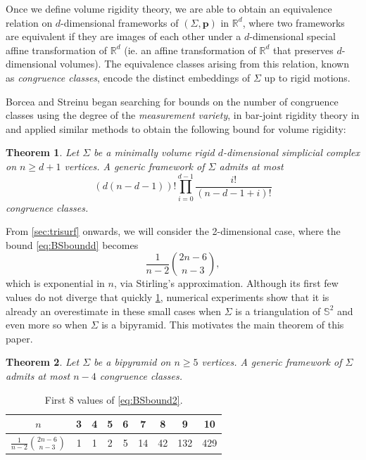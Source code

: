 \documentclass[11pt]{amsart}
\newtheorem{theorem}{Theorem}[section]
\theoremstyle{definition}
\theoremstyle{remark}
\begin{document}
Once we define volume rigidity theory, we are able to obtain an equivalence relation on $d$-dimensional frameworks of $(\Sigma,\mathbf{p})$ in $\mathbb{R}^d$, where two frameworks are equivalent if they are images of each other under a $d$-dimensional special affine transformation of $\mathbb{R}^d$ (ie. an affine transformation of $\mathbb{R}^d$ that preserves $d$-dimensional volumes).
The equivalence classes arising from this relation, known as \textit{congruence classes}, encode the distinct embeddings of $\Sigma$ up to rigid motions.

Borcea and Streinu began searching for bounds on the number of congruence classes using the degree of the \textit{measurement variety}, in bar-joint rigidity theory in \cite{borcea2002number} and applied similar methods to obtain the following bound for volume rigidity:

\begin{theorem}\label{thm:BSbound}\cite{borcea2012realizations}
    Let $\Sigma$ be a minimally volume rigid $d$-dimensional simplicial complex on $n\geq d+1$ vertices.
    A generic framework of $\Sigma$ admits at most
    \begin{equation}\label{eq:BSboundd}
        (d(n-d-1))!\prod\limits_{i=0}^{d-1}\frac{i!}{(n-d-1+i)!}
    \end{equation}
    congruence classes.
\end{theorem}

From \cref{sec:trisurf} onwards, we will consider the 2-dimensional case, where the bound \cref{eq:BSboundd} becomes
\begin{equation}\label{eq:BSbound2}
    \frac{1}{n-2}\binom{2n-6}{n-3},
\end{equation}
which is exponential in $n$, via Stirling's approximation.
Although its first few values do not diverge that quickly \cref{tab:BSbound2}, numerical experiments show that it is already an overestimate in these small cases when $\Sigma$ is a triangulation of $\mathbb{S}^2$ and even more so when $\Sigma$ is a bipyramid.
This motivates the main theorem of this paper.

\begin{theorem}\label{thm:main}
    Let $\Sigma$ be a bipyramid on $n\geq 5$ vertices.
    A generic framework of $\Sigma$ admits at most $n-4$ congruence classes.
\end{theorem}
\begin{centering}
\begin{table}[]
    \centering
    \begin{tabular}{|c||c|c|c|c|c|c|c|c|}
        \hline
        $n$ & 3 & 4 & 5 & 6 & 7 & 8 & 9 & 10 \\
        \hline
        $\frac{1}{n-2}\binom{2n-6}{n-3}$ & 1 & 1 & 2 & 5 & 14 & 42 & 132 & 429 \\
        \hline
    \end{tabular}
    \caption{First 8 values of \cref{eq:BSbound2}.}
    \label{tab:BSbound2}
\end{table}
\end{centering}
\end{document}
